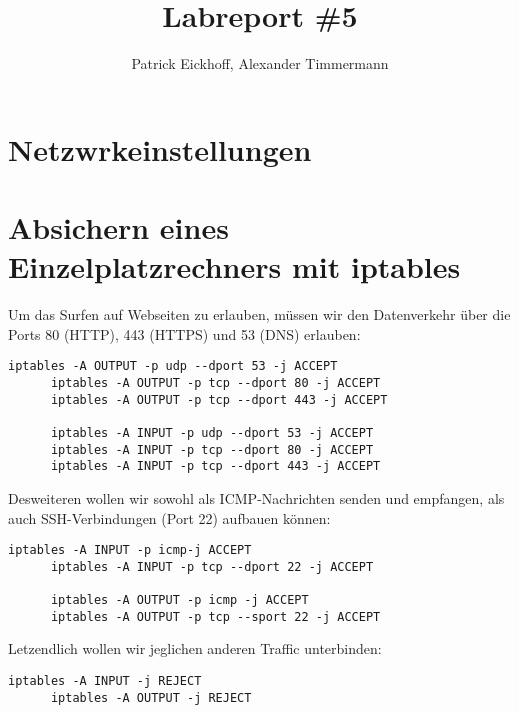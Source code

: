 \documentclass{scrartcl}
\author{Patrick Eickhoff, Alexander Timmermann}
\title{Labreport \#5}
\date{}
\begin{document}
    \maketitle
    \section*{Netzwrkeinstellungen}
    \label{sec:Netzwrkeinstellungen}

    \section{Absichern eines Einzelplatzrechners mit iptables}
    \label{sec:Absichern eines Einzelplatzrechners mit iptables}
    Um das Surfen auf Webseiten zu erlauben, müssen wir den Datenverkehr über
    die Ports 80 (HTTP), 443 (HTTPS) und 53 (DNS) erlauben:
    \begin{lstlisting}[style=BashInputStyle]
      iptables -A OUTPUT -p udp --dport 53 -j ACCEPT
      iptables -A OUTPUT -p tcp --dport 80 -j ACCEPT
      iptables -A OUTPUT -p tcp --dport 443 -j ACCEPT

      iptables -A INPUT -p udp --dport 53 -j ACCEPT
      iptables -A INPUT -p tcp --dport 80 -j ACCEPT
      iptables -A INPUT -p tcp --dport 443 -j ACCEPT
    \end{lstlisting}
    Desweiteren wollen wir sowohl als ICMP-Nachrichten senden und
    empfangen, als auch SSH-Verbindungen (Port 22) aufbauen können:
    \begin{lstlisting}[style=BashInputStyle]
      iptables -A INPUT -p icmp-j ACCEPT
      iptables -A INPUT -p tcp --dport 22 -j ACCEPT

      iptables -A OUTPUT -p icmp -j ACCEPT
      iptables -A OUTPUT -p tcp --sport 22 -j ACCEPT
    \end{lstlisting}
    Letzendlich wollen wir jeglichen anderen Traffic unterbinden:
    \begin{lstlisting}[style=BashInputStyle]
      iptables -A INPUT -j REJECT
      iptables -A OUTPUT -j REJECT
    \end{lstlisting}
\end{document}
